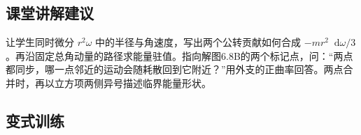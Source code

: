 \documentclass[UTF8,fontset=fandol,a4paper,11pt]{ctexart}
\newcommand{\dd}{\mathop{}\!\mathrm{d}}
\begin{document}


\subsection*{课堂讲解建议}

让学生同时微分 $r^2\omega$ 中的半径与角速度，写出两个公转贡献如何合成 $-mr^2\dd\omega/3$。再沿固定总角动量的路径求能量驻值。指向解图6.8B的两个标记点，问：“两点都同步，哪一点邻近的运动会随耗散回到它附近？”用外支的正曲率回答。两点合并时，再以立方项两侧异号描述临界能量形状。




\subsection*{变式训练}
\end{document}
